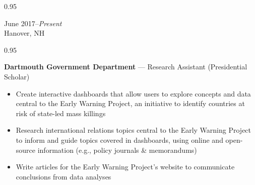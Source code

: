 \documentclass[a4paper,9pt]{article}
\newcommand{\mainMarginBottom}{\vspace*{1.5pt}}
\newcommand{\newLine}{\\}
\newcommand{\doubleColumnGap}{\hspace{4mm}}
\newcommand{\withinSectionMarginBetween}{\vspace{-3ex}}
\newcommand{\mainLineSpacing}{0.95}
\begin{document}
\begin{minipage}[t]{0.20\linewidth}
	\begin{small}
		\begin{spacing}\mainLineSpacing{}
			\begin{flushright}
				June 2017--\textit{Present}
				\newLine{}
				\mainMarginBottom{}
				Hanover, NH
			\end{flushright}
		\end{spacing}
	\end{small}
\end{minipage}
\doubleColumnGap{}
\begin{minipage}[t]{0.75\linewidth}
	\begin{small}
		\begin{spacing}\mainLineSpacing{}
			\begin{flushleft}
				\textbf{Dartmouth Government Department} --- Research Assistant (Presidential Scholar)
				\mainMarginBottom{}
				\begin{itemize}[itemsep=0pt,topsep=0pt,leftmargin=*]
					\item Create interactive dashboards that allow users to explore concepts and data central to the Early Warning Project,
					      an initiative to identify countries at risk of state-led mass killings
					\item Research international relations topics central to the Early Warning Project to inform and guide topics covered in dashboards, using online and open-source information (e.g., policy journals \& memorandums)
					\item Write articles for the Early Warning Project's website to communicate conclusions from data analyses
				\end{itemize}
			\end{flushleft}
		\end{spacing}
	\end{small}
\end{minipage}

\withinSectionMarginBetween{}
\end{document}
